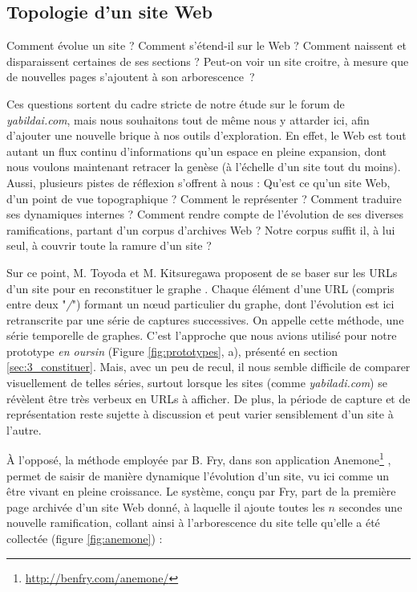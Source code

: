 \documentclass[symmetric,justified,marginals=raggedouter]{tufte-book}
\begin{document}
\subsection{Topologie d'un site Web}

\noindent Comment évolue un site ? Comment s'étend-il sur le Web ? Comment naissent et disparaissent certaines de ses sections ? Peut-on voir un site croitre, à mesure que de nouvelles pages s'ajoutent à son arborescence~? 

Ces questions sortent du cadre stricte de notre étude sur le forum de \textit{yabildai.com}, mais nous souhaitons tout de même nous y attarder ici, afin d'ajouter une nouvelle brique à nos outils d'exploration. En effet, le Web est tout autant un flux continu d'informations qu'un espace en pleine expansion, dont nous voulons maintenant retracer la genèse (à l'échelle d'un site tout du moins). Aussi, plusieurs pistes de réflexion s'offrent à nous : Qu'est ce qu'un site Web, d'un point de vue topographique ? Comment le représenter ? Comment traduire ses dynamiques internes ? Comment rendre compte de l'évolution de ses diverses ramifications, partant d'un corpus d'archives Web ? Notre corpus suffit il, à lui seul, à couvrir toute la ramure d'un site ? 

Sur ce point, M. Toyoda et M. Kitsuregawa proposent de se baser sur les URLs d'un site pour en reconstituer le graphe \citep{toyoda_extracting_2003,toyoda_system_2005}. Chaque élément d'une URL (compris entre deux "\textit{/}") formant un nœud particulier du graphe, dont l'évolution est ici retranscrite par une série de captures successives. On appelle cette méthode, une série temporelle de graphes. C'est l'approche que nous avions utilisé pour notre prototype \textit{en oursin} (Figure \ref{fig:prototypes}, a), présenté en section \ref{sec:3_constituer}. Mais, avec un peu de recul, il nous semble difficile de comparer visuellement de telles séries, surtout lorsque les sites (comme \textit{yabiladi.com}) se révèlent être très verbeux en URLs à afficher. De plus, la période de capture et de représentation reste sujette à discussion et peut varier sensiblement d'un site à l'autre.

À l'opposé, la méthode employée par B. Fry, dans son application Anemone\footnote{\url{http://benfry.com/anemone/}} \citep[p.76-82]{fry_organic_2000}, permet de saisir de manière dynamique l'évolution d'un site, vu ici comme un être vivant en pleine croissance. Le système, conçu par Fry, part de la première page archi\-vée d'un site Web donné, à laquelle il ajoute toutes les $n$ secondes une nouvelle ramification, collant ainsi à l'arborescence du site telle qu'elle a été collectée (figure \ref{fig:anemone}) :
\end{document}

